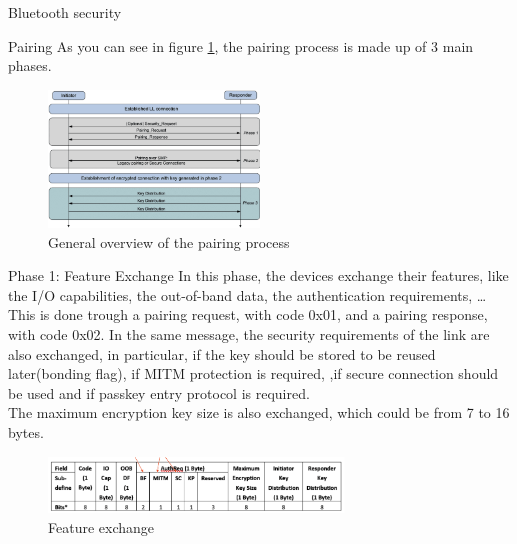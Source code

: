 \begin{section}{Bluetooth security}
\begin{subsection}{Pairing}
    As you can see in figure \ref{fig:pairing}, the pairing process is made up of 3 main phases.

    \begin{figure}[h]
      \centering
      \includegraphics[width=0.5\textwidth]{img/wireless/bt pairing overview.png}
      \caption{General overview of the pairing process}
      \label{fig:pairing}
    \end{figure}

    \begin{subsubsection}{Phase 1: Feature Exchange}
      In this phase, the devices exchange their features, like the I/O capabilities, the out-of-band
      data, the authentication requirements, \dots\\
      This is done trough a pairing request, with code 0x01, and a pairing response, with code 0x02.
      In the same message, the security requirements of the link are also exchanged, in particular,
      if the key should be stored to be reused later(bonding flag), if MITM protection is required,
      ,if secure connection should be used and if passkey entry protocol is required.\\
      The maximum encryption key size is also exchanged, which could be from 7 to 16 bytes.\\
      \begin{figure}[H]
        \centering
        \includegraphics[width=0.7\textwidth]{img/wireless/bt feature exchange.png}
        \caption{Feature exchange}
      \end{figure}
    \end{subsubsection}


\end{subsection}
\end{section}
